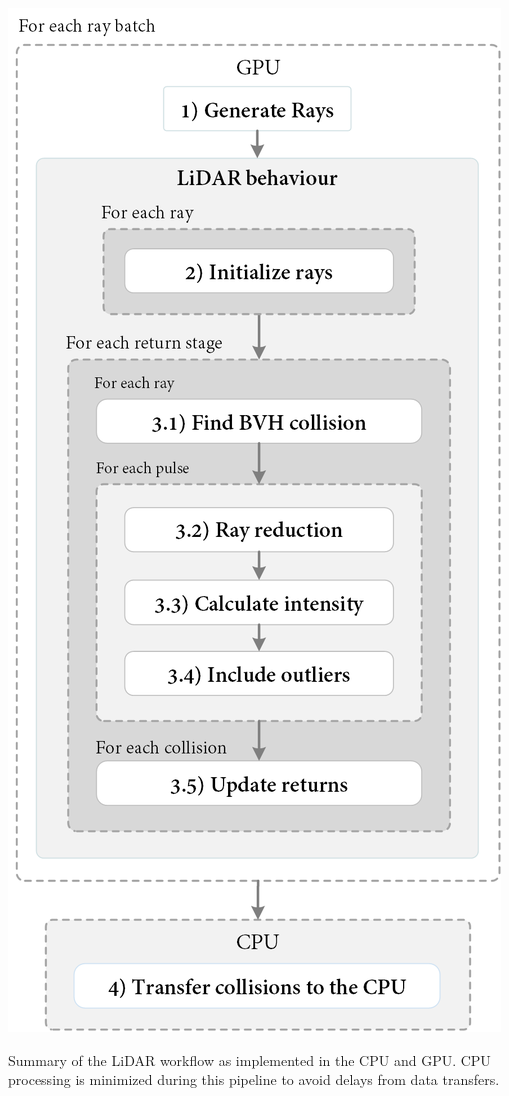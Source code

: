 \begin{marginfigure}[.0cm]
	\centering
	\includegraphics[width=\linewidth]{figs/lidar_simulation/lidar_overview.png}
	\caption{Summary of the LiDAR workflow as implemented in the CPU and GPU. CPU processing is minimized during this pipeline to avoid delays from data transfers.}
	\label{fig:lidar_workflow}
\end{marginfigure}
